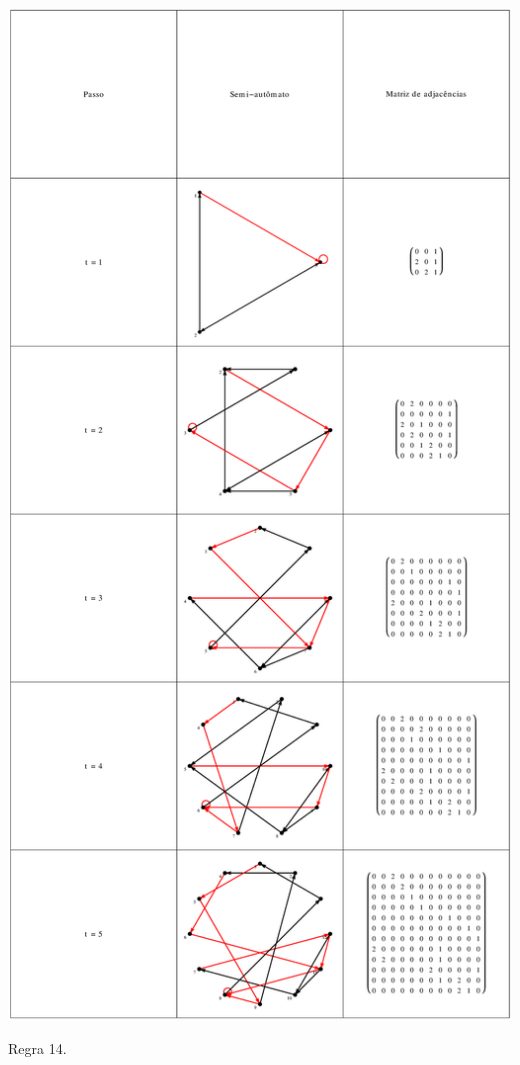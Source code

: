 \documentclass[12pt,a4paper]{article}
\begin{document}
\begin{table}[H]
\begin{center}
\includegraphics[scale=0.32]{img/mat/matr14.eps}
\caption{Regra 14.}
\label{tab:mr14}
\end{center}
\end{table}
\end{document}
